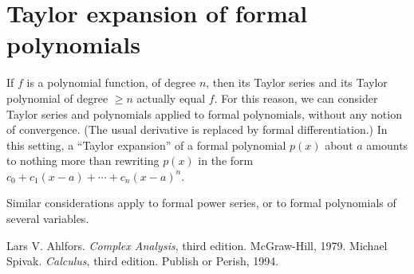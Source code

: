 \documentclass[12pt]{article}
\begin{document}
\section{Taylor expansion of formal polynomials}
If $f$ is a polynomial function, of degree $n$,
then its Taylor series and its Taylor polynomial of degree $\geq n$
actually equal $f$.  For this reason, we can consider Taylor series and polynomials
applied to formal polynomials, without any notion of convergence.
(The usual derivative is replaced by formal differentiation.)
In this setting, a ``Taylor expansion'' of a formal polynomial $p(x)$
about $a$ amounts to nothing more than rewriting $p(x)$
in the form $c_0 + c_1 (x-a) + \dotsb + c_n (x-a)^n$.

Similar considerations apply to formal power series,
or to formal polynomials of several variables.



\begin{thebibliography}{3}
Lars V. Ahlfors. {\it Complex Analysis}, third edition. McGraw-Hill, 1979.
Michael Spivak. {\it Calculus}, third edition. Publish or Perish, 1994.
\end{thebibliography}
\end{document}
